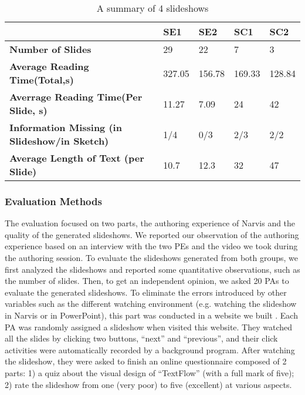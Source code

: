 \begin{table}
  \caption{A summary of 4 slideshows}
  \label{tab:slides1}
  \small
  \centering
  \begin{tabu}{p{2cm}|p{0.9cm}|p{0.9cm}|p{0.9cm}|p{0.9cm}}
  \toprule
 \textbf{} &\textbf{SE1} & \textbf{SE2} & \textbf{SC1}& \textbf{SC2} \\ 
   \midrule
  \textbf{Number of Slides } & 29  & 22 & 7 & 3 \\ 
 \midrule
  \textbf{Average Reading Time(Total,s)} & 327.05 & 156.78 & 169.33 & 128.84\\ 
 \midrule
  \textbf{Averrage Reading Time(Per Slide, s)} & 11.27 & 7.09 &24 & 42\\ 
   \midrule
  \textbf{Information Missing (in Slideshow/in Sketch) }& 1/4 & 0/3 & 2/3 & 2/2\\ 
     \midrule
  \textbf{Average Length of Text (per Slide) }& 10.7 & 12.3 & 32 & 47\\ 
    
  \bottomrule

  \end{tabu}
  \vspace{1mm}
\end{table}

\subsubsection{Evaluation Methods}
The evaluation focused on two parts, the authoring experience of Narvis and the quality of the generated slideshows. We reported our observation of the authoring experience based on an interview with the two PEs and the video we took during the authoring session. 
To evaluate the slideshows generated from both groups, we first analyzed the slideshows and reported some quantitative observations, such as the number of slides.
Then, to get an independent opinion, we asked 20 PAs to evaluate the generated slideshows. To eliminate the errors introduced by other variables such as the different watching environment (e.g. watching the slideshow in Narvis or in PowerPoint), this part was conducted in a website we built . Each PA was randomly assigned a slideshow when visited this website. They watched all the slides by clicking two buttons, ``next'' and ``previous'', and their click activities were automatically recorded by a background program.  After watching the slideshow, they were asked to finish an online questionnaire composed of 2 parts: 1) a quiz about the visual design of ``TextFlow'' (with a full mark of five); 2) rate the slideshow from one (very poor) to five (excellent) at various aspects. 






